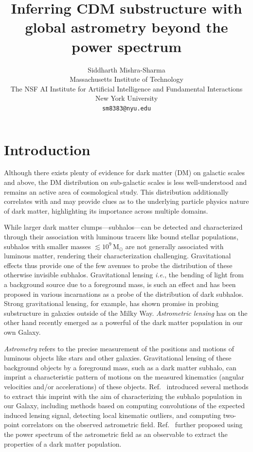 \documentclass[]{article}
\title{Inferring CDM substructure with \\ global astrometry beyond the power spectrum}
\author{
Siddharth Mishra-Sharma \\
Massachusetts Institute of Technology \\
The NSF AI Institute for Artificial Intelligence and Fundamental Interactions \\
New York University \\
\texttt{sm8383@nyu.edu} \\
}
\begin{document}
\maketitle

\begin{abstract}
\lipsum[2] 
\end{abstract}

\section{Introduction}
\label{sec:intro}

Although there exists plenty of evidence for dark matter (DM) on galactic scales and above,
the DM distribution on sub-galactic scales is less well-understood and remains an active area of cosmological study. This distribution additionally correlates with and may provide clues as to the underlying particle physics nature of dark matter, highlighting its importance across multiple domains. 

While larger dark matter clumps---subhalos---can be detected and characterized through their association with luminous tracers like bound stellar populations, subhalos with smaller masses $\lesssim 10^9\,\mathrm M_\odot$ are not generally associated with luminous matter, rendering their characterization challenging. Gravitational effects thus provide one of the few avenues to probe the distribution of these otherwise invisible subhalos. Gravitational lensing \emph{i.e.}, the bending of light from a background source due to a foreground mass, is such an effect and has been proposed in various incarnations as a probe of the distribution of dark subhalos. Strong gravitational lensing, for example, has shown promise in probing substructure in galaxies outside of the Milky Way. \emph{Astrometric lensing} has on the other hand recently emerged as a powerful of the dark matter population in our own Galaxy.

\emph{Astrometry} refers to the precise measurement of the positions and motions of luminous objects like stars and other galaxies. Gravitational lensing of these background objects by a foreground mass, such as a dark matter subhalo, can imprint a characteristic pattern of motions on the measured kinematics (angular velocities and/or accelerations) of these objects. Ref.~\cite{VanTilburg:2018ykj} introduced several methods to extract this imprint with the aim of characterizing the subhalo population in our Galaxy, including methods based on computing convolutions of the expected induced lensing signal, detecting local kinematic outliers, and computing two-point correlators on the observed astrometric field. Ref.~\cite{Mishra-Sharma:2020ynk} further proposed using the power spectrum of the astrometric field as an observable to extract the properties of a dark matter population.
\end{document}
